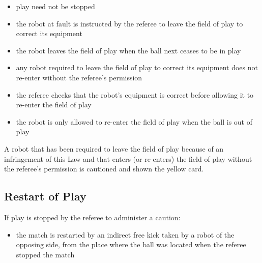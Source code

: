 \begin{itemize}
\item play need not be stopped
\item the robot at fault is instructed by the referee to leave the field of play to correct its equipment
\item the robot leaves the field of play when the ball next ceases to be in play
\item any robot required to leave the field of play to correct its equipment does not re-enter without the referee's permission
\item the referee checks that the robot's equipment is correct before allowing it to re-enter the field of play
\item the robot is only allowed to re-enter the field of play when the ball is out of play
\end{itemize}

A robot that has been required to leave the field of play because of an infringement of this Law and that enters (or re-enters) the field of play without the referee's permission is cautioned and shown the yellow card.

\subsection{Restart of Play}
If play is stopped by the referee to administer a caution:

\begin{itemize}
\item the match is restarted by an indirect free kick taken by a robot of the opposing side, from the place where the ball was located when the referee stopped the match
\end{itemize}

